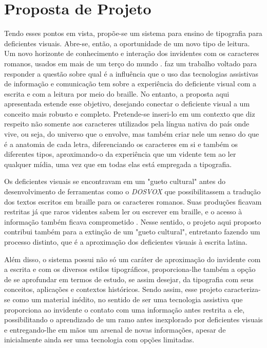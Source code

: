 \section{Proposta de Projeto}

Tendo esses pontos em vista, propõe-se um sistema para ensino de tipografia para deficientes visuais. Abre-se, então, a oportunidade de um novo tipo de leitura. Um novo horizonte de conhecimento e interação dos invidentes com os caracteres romanos, usados em mais de um terço do mundo .  faz um trabalho voltado para responder a questão sobre qual é a influência que o uso das tecnologias assistivas de informação e comunicação tem sobre a experiência do deficiente visual com a escrita e com a leitura por meio do braille. No entanto, a proposta aqui apresentada estende esse objetivo, desejando conectar o deficiente visual a um conceito mais robusto e completo. Pretende-se inseri-lo em um contexto que diz respeito não somente aos caracteres utilizados pela língua nativa do país onde vive, ou seja, do universo que o envolve, mas também criar nele um senso do que é a anatomia de cada letra, diferenciando os caracteres em si e também os diferentes tipos, aproximando-o da experiência que um vidente tem ao ler qualquer mídia, uma vez que em todas elas está empregada a tipografia.

Os deficientes visuais se encontravam em um "gueto cultural" antes do desenvolvimento de ferramentas como o \textit{DOSVOX} que possibilitassem a tradução dos textos escritos em braille para os caracteres romanos. Suas produções ficavam restritas já que raros videntes sabem ler ou escrever em braille, e o acesso à informação também ficava comprometido . Nesse sentido, o projeto aqui proposto contribui também para a extinção de um "gueto cultural", entretanto fazendo um processo distinto, que é a aproximação dos deficientes visuais à escrita latina.

Além disso, o sistema possui não só um caráter de aproximação do invidente com a escrita e com os diversos estilos tipográficos, proporciona-lhe também a opção de se aprofundar em termos de estudo, se assim desejar, da tipografia com seus conceitos, aplicações e contextos históricos. Sendo assim, esse projeto caracteriza-se como um material inédito, no sentido de ser uma tecnologia assistiva que proporciona ao invidente o contato com uma informação antes restrita a ele, possibilitando o aprendizado de um ramo antes inexplorado por deficientes visuais e entregando-lhe em mãos um arsenal de novas informações, apesar de inicialmente ainda ser uma tecnologia com opções limitadas.


